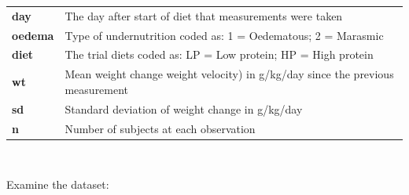 \documentclass[12pt,a4paper]{book}
\theoremstyle{definition}
\theoremstyle{definition}
\theoremstyle{definition}
\theoremstyle{remark}
\begin{document}
\begin{longtable}[]{@{}ll@{}}
\toprule
\endhead
\begin{minipage}[t]{0.16\columnwidth}\raggedright
\textbf{day}\strut
\end{minipage} & \begin{minipage}[t]{0.79\columnwidth}\raggedright
The day after start of diet that measurements were taken\strut
\end{minipage}\tabularnewline
\begin{minipage}[t]{0.16\columnwidth}\raggedright
\textbf{oedema}\strut
\end{minipage} & \begin{minipage}[t]{0.79\columnwidth}\raggedright
Type of undernutrition coded as: 1 = Oedematous; 2 = Marasmic\strut
\end{minipage}\tabularnewline
\begin{minipage}[t]{0.16\columnwidth}\raggedright
\textbf{diet}\strut
\end{minipage} & \begin{minipage}[t]{0.79\columnwidth}\raggedright
The trial diets coded as: LP = Low protein; HP = High protein\strut
\end{minipage}\tabularnewline
\begin{minipage}[t]{0.16\columnwidth}\raggedright
\textbf{wt}\strut
\end{minipage} & \begin{minipage}[t]{0.79\columnwidth}\raggedright
Mean weight change weight velocity) in g/kg/day since the previous
measurement\strut
\end{minipage}\tabularnewline
\begin{minipage}[t]{0.16\columnwidth}\raggedright
\textbf{sd}\strut
\end{minipage} & \begin{minipage}[t]{0.79\columnwidth}\raggedright
Standard deviation of weight change in g/kg/day\strut
\end{minipage}\tabularnewline
\begin{minipage}[t]{0.16\columnwidth}\raggedright
\textbf{n}\strut
\end{minipage} & \begin{minipage}[t]{0.79\columnwidth}\raggedright
Number of subjects at each observation\strut
\end{minipage}\tabularnewline
\bottomrule
\end{longtable}

~

Examine the dataset:
\end{document}
